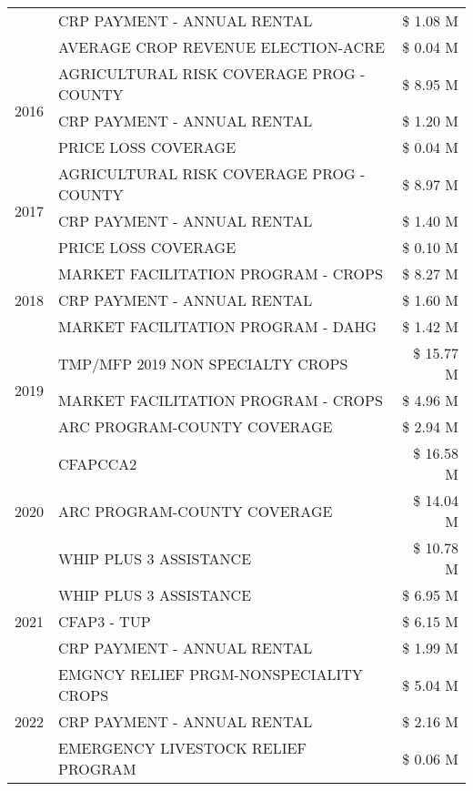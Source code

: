 \begin{tabular}{llr}
 & CRP PAYMENT - ANNUAL RENTAL & \$ 1.08 M \\
 & AVERAGE CROP REVENUE ELECTION-ACRE & \$ 0.04 M \\
\cline{1-3}
\multirow[t]{3}{*}{2016} & AGRICULTURAL RISK COVERAGE PROG - COUNTY & \$ 8.95 M \\
 & CRP PAYMENT - ANNUAL RENTAL & \$ 1.20 M \\
 & PRICE LOSS COVERAGE & \$ 0.04 M \\
\cline{1-3}
\multirow[t]{3}{*}{2017} & AGRICULTURAL RISK COVERAGE PROG - COUNTY & \$ 8.97 M \\
 & CRP PAYMENT - ANNUAL RENTAL & \$ 1.40 M \\
 & PRICE LOSS COVERAGE & \$ 0.10 M \\
\cline{1-3}
\multirow[t]{3}{*}{2018} & MARKET FACILITATION PROGRAM - CROPS & \$ 8.27 M \\
 & CRP PAYMENT - ANNUAL RENTAL & \$ 1.60 M \\
 & MARKET FACILITATION PROGRAM - DAHG & \$ 1.42 M \\
\cline{1-3}
\multirow[t]{3}{*}{2019} & TMP/MFP 2019 NON SPECIALTY CROPS & \$ 15.77 M \\
 & MARKET FACILITATION PROGRAM - CROPS & \$ 4.96 M \\
 & ARC PROGRAM-COUNTY COVERAGE & \$ 2.94 M \\
\cline{1-3}
\multirow[t]{3}{*}{2020} & CFAPCCA2 & \$ 16.58 M \\
 & ARC PROGRAM-COUNTY COVERAGE & \$ 14.04 M \\
 & WHIP PLUS 3 ASSISTANCE & \$ 10.78 M \\
\cline{1-3}
\multirow[t]{3}{*}{2021} & WHIP PLUS 3 ASSISTANCE & \$ 6.95 M \\
 & CFAP3 - TUP & \$ 6.15 M \\
 & CRP PAYMENT - ANNUAL RENTAL & \$ 1.99 M \\
\cline{1-3}
\multirow[t]{3}{*}{2022} & EMGNCY RELIEF PRGM-NONSPECIALITY CROPS & \$ 5.04 M \\
 & CRP PAYMENT - ANNUAL RENTAL & \$ 2.16 M \\
 & EMERGENCY LIVESTOCK RELIEF PROGRAM & \$ 0.06 M \\
\cline{1-3}
\bottomrule
\end{tabular}
